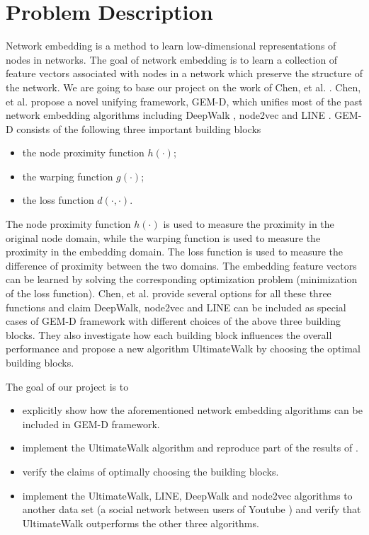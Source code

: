 \documentclass{sig-alternate-05-2015}
\begin{document}
\section{Problem Description}
Network embedding is a method to learn low-dimensional representations of nodes in networks. The goal of network embedding is to learn a collection of feature vectors associated with nodes in a network which preserve the structure of the network. We are going to base our project on the work of Chen, et al. \cite{DBLP:journals/corr/ChenNAKF17}. Chen, et al. propose a novel unifying framework, GEM-D, which unifies most of the past network embedding algorithms including  DeepWalk \cite{DBLP:conf/kdd/PerozziAS14}, node2vec \cite{DBLP:conf/kdd/GroverL16} and LINE \cite{DBLP:conf/www/TangQWZYM15}. GEM-D consists of the following three important building blocks
\begin{itemize}
    \item the node proximity function $h(\cdot)$;
    \item the warping function $g(\cdot)$;
    \item the loss function $d(\cdot,\cdot)$.
\end{itemize}
The node proximity function $h(\cdot)$ is used to measure the proximity in the original node domain, while the warping function is used to measure the proximity in the embedding domain. The loss function is used to measure the difference of proximity between the two domains. The embedding feature vectors can be learned by solving the corresponding optimization problem (minimization of the loss function). Chen, et al. provide several options for all these three functions and claim DeepWalk, node2vec and LINE can be included as special cases of GEM-D framework with different choices of the above three building blocks. They also investigate how each building block influences the overall performance and propose a new algorithm UltimateWalk by choosing the optimal building blocks. 

The goal of our project is to 
\begin{itemize}
    \item explicitly show how the aforementioned network embedding algorithms can be included in GEM-D framework.
    \item implement the UltimateWalk algorithm and reproduce part of the results of \cite{DBLP:journals/corr/ChenNAKF17}.
    \item verify the claims of optimally choosing the building blocks.
    \item implement the UltimateWalk, LINE, DeepWalk and node2vec algorithms to another data set (a social network between users of Youtube \cite{DBLP:conf/cikm/TangL09}) and verify that UltimateWalk outperforms the other three algorithms. 
\end{itemize}
\end{document}
